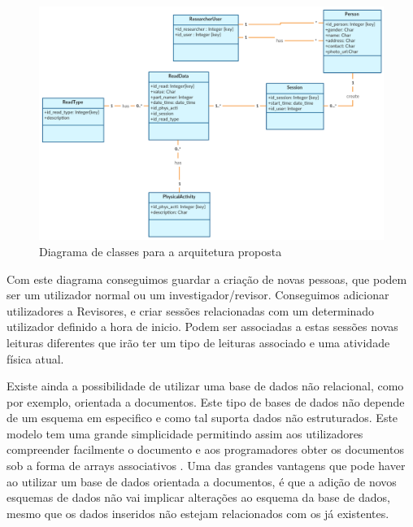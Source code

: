 \begin{figure}[H]
  \centering
  \includegraphics[width=1\textwidth]{imgs/class-diagram.png}
  \caption[Diagrama de classes para a arquitetura proposta]{Diagrama de classes para a arquitetura proposta}
  
  \label{f:class-diagram}
\end{figure}

Com este diagrama conseguimos guardar a criação de novas pessoas, que podem ser um utilizador normal ou um investigador/revisor. Conseguimos adicionar utilizadores a Revisores, e criar sessões relacionadas com um determinado utilizador definido a hora de inicio. Podem ser associadas a estas sessões novas leituras diferentes que irão ter um tipo de leituras associado e uma atividade física atual.
\par 
Existe ainda a possibilidade de utilizar uma base de dados não relacional, como por exemplo, orientada a documentos. Este tipo de bases de dados não depende de um esquema em especifico e como tal suporta dados não estruturados. Este modelo tem uma grande simplicidade permitindo assim aos utilizadores compreender facilmente o documento e aos programadores  obter os documentos sob a forma de arrays associativos \cite{nosql}. Uma das grandes vantagens que pode haver ao utilizar um base de dados orientada a documentos, é que a adição de novos esquemas de dados não vai implicar alterações ao esquema da base de dados, mesmo que os dados inseridos não estejam relacionados com os já existentes.






